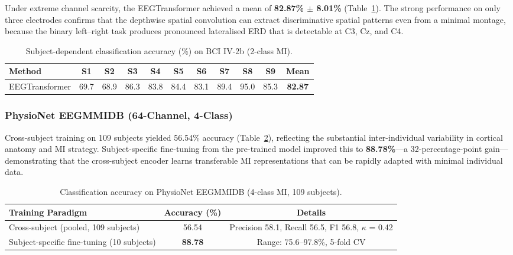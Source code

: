 \documentclass[12pt, a4paper]{article}
\begin{document}
Under extreme channel scarcity, the EEGTransformer achieved a mean of \textbf{82.87\% $\pm$ 8.01\%} (Table~\ref{tab:iv2b_results}). The strong performance on only three electrodes confirms that the depthwise spatial convolution can extract discriminative spatial patterns even from a minimal montage, because the binary left--right task produces pronounced lateralised ERD that is detectable at C3, Cz, and C4.

\begin{table}[htbp]
\centering
\caption{Subject-dependent classification accuracy (\%) on BCI IV-2b (2-class MI).}
\label{tab:iv2b_results}
\begin{tabular}{lcccccccccc}
\toprule
\textbf{Method} & \textbf{S1} & \textbf{S2} & \textbf{S3} & \textbf{S4} & \textbf{S5} & \textbf{S6} & \textbf{S7} & \textbf{S8} & \textbf{S9} & \textbf{Mean} \\
\midrule
EEGTransformer & 69.7 & 68.9 & 86.3 & 83.8 & 84.4 & 83.1 & 89.4 & 95.0 & 85.3 & \textbf{82.87} \\
\bottomrule
\end{tabular}
\end{table}

\subsubsection{PhysioNet EEGMMIDB (64-Channel, 4-Class)}

Cross-subject training on 109 subjects yielded 56.54\% accuracy (Table~\ref{tab:physionet_results}), reflecting the substantial inter-individual variability in cortical anatomy and MI strategy. Subject-specific fine-tuning from the pre-trained model improved this to \textbf{88.78\%}---a 32-percentage-point gain---demonstrating that the cross-subject encoder learns transferable MI representations that can be rapidly adapted with minimal individual data.

\begin{table}[htbp]
\centering
\caption{Classification accuracy on PhysioNet EEGMMIDB (4-class MI, 109 subjects).}
\label{tab:physionet_results}
\begin{tabular}{lcc}
\toprule
\textbf{Training Paradigm} & \textbf{Accuracy (\%)} & \textbf{Details} \\
\midrule
Cross-subject (pooled, 109 subjects) & 56.54 & Precision 58.1, Recall 56.5, F1 56.8, $\kappa$ = 0.42 \\
Subject-specific fine-tuning (10 subjects) & \textbf{88.78} & Range: 75.6--97.8\%, 5-fold CV \\
\bottomrule
\end{tabular}
\end{table}
\end{document}
